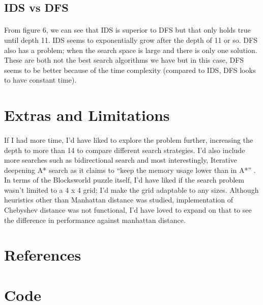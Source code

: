 \documentclass[10pt]{article}
\begin{document}
  \subsection{IDS vs DFS}
  \paragraph{} \indent
  From figure 6, we can see that IDS is superior to DFS but that only holds true until depth 11. IDS seems to exponentially grow after the depth of 11 or so. DFS also has a problem; when the search space is large and there is only one solution. These are both not the best search algorithms we have but in this case, DFS seems to be better because of the time complexity (compared to IDS, DFS looks to have constant time).  


  \section{Extras and Limitations}
  \paragraph{} \indent
  If I had more time, I’d have liked to explore the problem further, increasing the depth to more than 14 to compare different search strategies. I’d also include more searches such as bidirectional search and most interestingly, Iterative deepening A* search as it claims to ``keep the memory usage lower than in A*'' \cite{ida*}. In terms of the Blocksworld puzzle itself, I'd have liked if the search problem wasn't limited to a 4 x 4 grid; I'd make the grid adaptable to any sizes. Although heuristics other than Manhattan distance was studied, implementation of Chebyshev distance \cite{chev} was not functional, I'd have loved to expand on that to see the difference in performance against manhattan distance. 

  \section{References}

  \section{Code}
 
 
\end{document}
